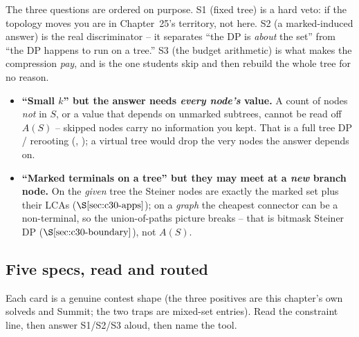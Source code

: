 The three questions are ordered on purpose.  S1 (fixed tree) is a hard veto: if the
topology moves you are in Chapter~25's territory, not here.  S2 (a marked-induced
answer) is the real discriminator -- it separates ``the DP is \emph{about} the set''
from ``the DP happens to run on a tree.''  S3 (the budget arithmetic) is what makes
the compression \emph{pay}, and is the one students skip and then rebuild the whole
tree for no reason.

\begin{warningbox}
\begin{itemize}[nosep,leftmargin=1.4em]
  \item \textbf{``Small \(k\)'' but the answer needs \emph{every node's} value.} A
        count of nodes \emph{not} in \(S\), or a value that depends on unmarked
        subtrees, cannot be read off \(A(S)\) -- skipped nodes carry no information
        you kept.  That is a full tree DP / rerooting (, ); a
        virtual tree would drop the very nodes the answer depends on.
  \item \textbf{``Marked terminals on a tree'' but they may meet at a \emph{new}
        branch node.} On the \emph{given} tree the Steiner nodes are exactly the
        marked set plus their LCAs (\(\secref{c30-apps}\)); on a \emph{graph} the
        cheapest connector can be a non-terminal, so the union-of-paths picture
        breaks -- that is bitmask Steiner DP (\(\secref{c30-boundary}\)), not \(A(S)\).
\end{itemize}
\end{warningbox}

\subsection{Five specs, read and routed}

Each card is a genuine contest shape (the three positives are this chapter's own
solveds and Summit; the two traps are mixed-set entries).  Read the constraint line,
then answer S1/S2/S3 aloud, then name the tool.

